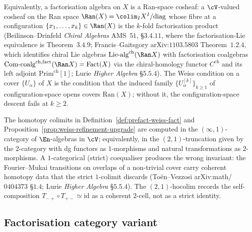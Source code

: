 \begin{remark}
\label{rem:ran-reformulation}
Equivalently, a factorisation algebra on $X$ is a Ran-space cosheaf: a $\cV$-valued cosheaf on the Ran space $\Ran(X) = \colim_I X^I / \mathrm{diag}$ whose fibre at a configuration $\{x_1, \ldots, x_k\} \in \Ran(X)$ is the $k$-fold factorisation product \textup{(}Beilinson--Drinfeld \emph{Chiral Algebras} AMS~$51$, \S$3.4.11$, where the factorisation-Lie equivalence is Theorem~$3.4.9$; Francis--Gaitsgory arXiv:$1103.5803$ Theorem~$1.2.4$, which identifies chiral Lie algebras $\mathrm{Lie}\text{-alg}^{\mathrm{ch}}(\Ran X)$ with factorisation coalgebras $\mathrm{Com}\text{-coalg}^{\mathrm{ch,fact}}(\Ran X) = \mathrm{Fact}(X)$ via the chiral-homology functor $C^{\mathrm{ch}}$ and its left adjoint $\mathrm{Prim}^{\mathrm{ch}}[1]$; Lurie \emph{Higher Algebra} §$5.5.4$\textup{).} The Weiss condition on a cover $\{U_\alpha\}$ of $X$ is the condition that the induced family $\{U_\alpha^{[k]}\}_{k \geq 1}$ of configuration-space opens covers $\mathrm{Ran}(X)$; without it, the configuration-space descent fails at $k \geq 2$.
\end{remark}

\begin{remark}
\label{rem:hocolim-inf-cat}
The homotopy colimits in Definition~\ref{def:prefact-weiss-fact} and Proposition~\ref{prop:weiss-refinement-upgrade} are computed in the $(\infty, 1)$-category of $\En$-algebras in $\cV$; equivalently, in the $(2, 1)$-truncation given by the $2$-category with dg functors as $1$-morphisms and natural transformations as $2$-morphisms. A $1$-categorical (strict) coequaliser produces the wrong invariant: the Fourier--Mukai transitions on overlaps of a non-trivial cover carry coherent homotopy data that the strict $1$-colimit discards (Toën--Vezzosi arXiv:math/$0404373$ §$1.4$; Lurie \emph{Higher Algebra} §$5.5.4$). The $(2, 1)$-hocolim records the self-composition $T_{-+} \circ T_{+-} \simeq \mathrm{id}$ as a coherent $2$-cell, not as a strict identity.
\end{remark}

\subsection{Factorisation category variant}
\label{subsec:fact-category-variant}

